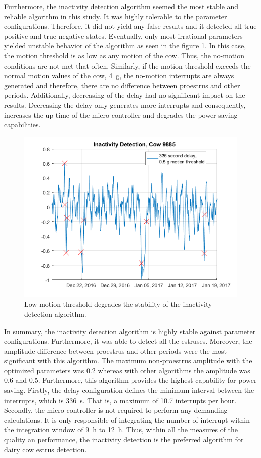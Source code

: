 \documentclass[english,12pt,a4paper,pdftex,elec,utf8]{aaltothesis}
\begin{document}
Furthermore, the inactivity detection algorithm seemed the most stable and reliable algorithm in this study. It was highly tolerable to the parameter configurations. Therefore, it did not yield any false results and it detected all true positive and true negative states. Eventually, only most irrational parameters yielded unstable behavior of the algorithm as seen in the figure \ref{InactivityDetectionCow9885_336period05threshold}. In this case, the motion threshold is as low as any motion of the cow. Thus, the no-motion conditions are not met that often. Similarly, if the motion threshold exceeds the normal motion values of the cow, \SI{4}{\gram}, the no-motion interrupts are always generated and therefore, there are no difference between proestrus and other periods. Additionally, decreasing of the delay had no significant impact on the results. Decreasing the delay only generates more interrupts and consequently, increases the up-time of the micro-controller and degrades the power saving capabilities. 

\begin{figure}[htb]
\centering
\includegraphics[width = 0.75 \textwidth]{figures/InactivityDetectionCow9885_336period05threshold.png}
\caption{Low motion threshold degrades the stability of the inactivity detection algorithm.}
\label{InactivityDetectionCow9885_336period05threshold}
\end{figure}

In summary, the inactivity detection algorithm is highly stable against parameter configurations. Furthermore, it was able to detect all the estruses. Moreover, the amplitude difference between proestrus and other periods were the most significant with this algorithm. The maximum non-proestrus amplitude with the optimized parameters was 0.2 whereas with other algorithms the amplitude was 0.6 and 0.5. Furthermore, this algorithm provides the highest capability for power saving. Firstly, the delay configuration defines the minimum interval between the interrupts, which is \SI{336}{\second}. That is, a maximum of 10.7 interrupts per hour. Secondly, the micro-controller is not required to perform any demanding calculations. It is only responsible of integrating the number of interrupt within the integration window of \SI{9}{\hour} to \SI{12}{\hour}. Thus, within all the measures of the quality an performance, the inactivity detection is the preferred algorithm for dairy cow estrus detection.
\end{document}
